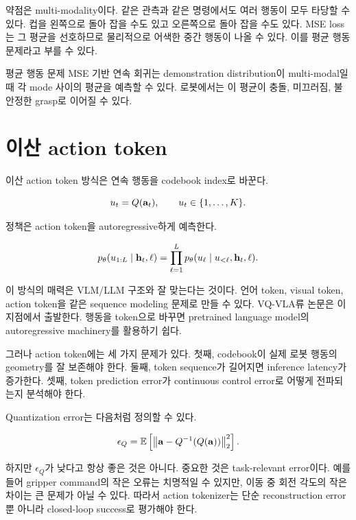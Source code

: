 약점은 multi-modality이다. 같은 관측과 같은 명령에서도 여러 행동이 모두 타당할 수 있다. 컵을 왼쪽으로 돌아 잡을 수도 있고 오른쪽으로 돌아 잡을 수도 있다. MSE loss는 그 평균을 선호하므로 물리적으로 어색한 중간 행동이 나올 수 있다. 이를 평균 행동 문제라고 부를 수 있다.

\begin{warningbox}{평균 행동 문제}
MSE 기반 연속 회귀는 demonstration distribution이 multi-modal일 때 각 mode 사이의 평균을 예측할 수 있다. 로봇에서는 이 평균이 충돌, 미끄러짐, 불안정한 grasp로 이어질 수 있다.
\end{warningbox}

\section{이산 action token}

이산 action token 방식은 연속 행동을 codebook index로 바꾼다.

\begin{equation}
  u_t = Q(\mathbf{a}_t),
  \qquad
  u_t \in \{1,\ldots,K\}.
\end{equation}

정책은 action token을 autoregressive하게 예측한다.

\begin{equation}
  p_\theta(u_{1:L}\mid \mathbf{h}_t,\ell)
  =
  \prod_{\ell=1}^{L}
  p_\theta(u_\ell \mid u_{<\ell},\mathbf{h}_t,\ell).
\end{equation}

이 방식의 매력은 VLM/LLM 구조와 잘 맞는다는 것이다. 언어 token, visual token, action token을 같은 sequence modeling 문제로 만들 수 있다. VQ-VLA류 논문은 이 지점에서 출발한다. 행동을 token으로 바꾸면 pretrained language model의 autoregressive machinery를 활용하기 쉽다.

그러나 action token에는 세 가지 문제가 있다. 첫째, codebook이 실제 로봇 행동의 geometry를 잘 보존해야 한다. 둘째, token sequence가 길어지면 inference latency가 증가한다. 셋째, token prediction error가 continuous control error로 어떻게 전파되는지 분석해야 한다.

Quantization error는 다음처럼 정의할 수 있다.

\begin{equation}
  \epsilon_Q
  =
  \mathbb{E}
  \left[
  \left\|
  \mathbf{a} - Q^{-1}(Q(\mathbf{a}))
  \right\|_2^2
  \right].
\end{equation}

하지만 $\epsilon_Q$가 낮다고 항상 좋은 것은 아니다. 중요한 것은 task-relevant error이다. 예를 들어 gripper command의 작은 오류는 치명적일 수 있지만, 이동 중 회전 각도의 작은 차이는 큰 문제가 아닐 수 있다. 따라서 action tokenizer는 단순 reconstruction error뿐 아니라 closed-loop success로 평가해야 한다.

